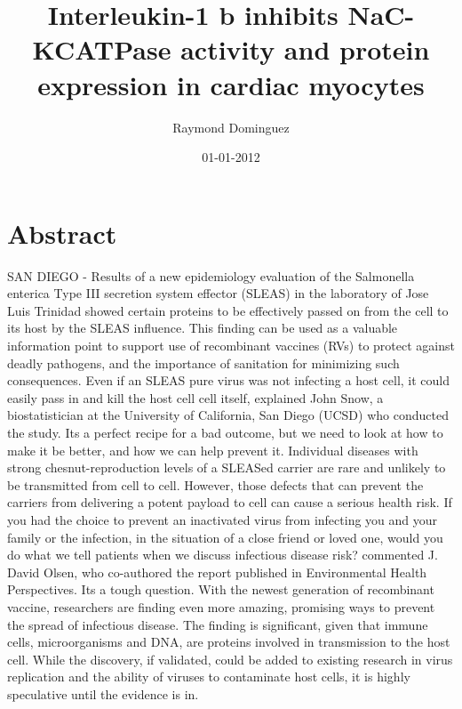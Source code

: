 \documentclass{article}%
\title{Interleukin{-}1 b inhibits NaC{-}KCATPase activity and protein expression in cardiac myocytes}%
\author{Raymond Dominguez}%
\affil{Department of Laboratory Medicine, The First Affiliated Hospital of Sun Yat{-}sen University, Guangzhou, Guangdong, China}%
\date{01{-}01{-}2012}%
\begin{document}
%
\normalsize%
\maketitle%
\section{Abstract}%
\label{sec:Abstract}%
SAN DIEGO {-} Results of a new epidemiology evaluation of the Salmonella enterica Type III secretion system effector (SLEAS) in the laboratory of Jose Luis Trinidad showed certain proteins to be effectively passed on from the cell to its host by the SLEAS influence.\newline%
This finding can be used as a valuable information point to support use of recombinant vaccines (RVs) to protect against deadly pathogens, and the importance of sanitation for minimizing such consequences.\newline%
Even if an SLEAS pure virus was not infecting a host cell, it could easily pass in and kill the host cell cell itself, explained John Snow, a biostatistician at the University of California, San Diego (UCSD) who conducted the study. Its a perfect recipe for a bad outcome, but we need to look at how to make it be better, and how we can help prevent it.\newline%
Individual diseases with strong chesnut{-}reproduction levels of a SLEASed carrier are rare and unlikely to be transmitted from cell to cell. However, those defects that can prevent the carriers from delivering a potent payload to cell can cause a serious health risk.\newline%
If you had the choice to prevent an inactivated virus from infecting you and your family or the infection, in the situation of a close friend or loved one, would you do what we tell patients when we discuss infectious disease risk? commented J. David Olsen, who co{-}authored the report published in Environmental Health Perspectives. Its a tough question. With the newest generation of recombinant vaccine, researchers are finding even more amazing, promising ways to prevent the spread of infectious disease.\newline%
The finding is significant, given that immune cells, microorganisms and DNA, are proteins involved in transmission to the host cell. While the discovery, if validated, could be added to existing research in virus replication and the ability of viruses to contaminate host cells, it is highly speculative until the evidence is in.\newline%
\end{document}
